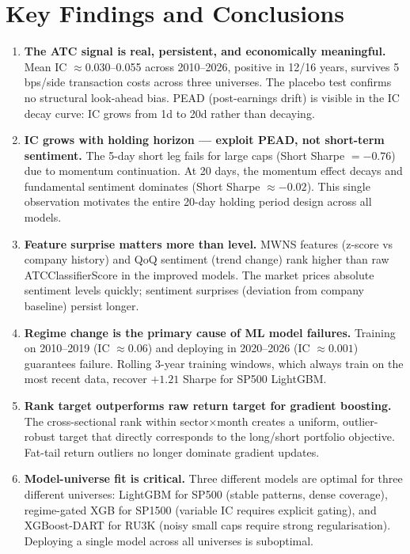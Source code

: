 \documentclass[11pt,a4paper]{article}
\begin{document}
\section{Key Findings and Conclusions}

\begin{enumerate}[leftmargin=*]
  \item \textbf{The ATC signal is real, persistent, and economically meaningful.} Mean IC $\approx 0.030$--0.055 across 2010--2026, positive in 12/16 years, survives 5\,bps/side transaction costs across three universes. The placebo test confirms no structural look-ahead bias. PEAD (post-earnings drift) is visible in the IC decay curve: IC grows from 1d to 20d rather than decaying.

  \item \textbf{IC grows with holding horizon --- exploit PEAD, not short-term sentiment.} The 5-day short leg fails for large caps (Short Sharpe $= -0.76$) due to momentum continuation. At 20 days, the momentum effect decays and fundamental sentiment dominates (Short Sharpe $\approx -0.02$). This single observation motivates the entire 20-day holding period design across all models.

  \item \textbf{Feature surprise matters more than level.} MWNS features (z-score vs company history) and QoQ sentiment (trend change) rank higher than raw ATCClassifierScore in the improved models. The market prices absolute sentiment levels quickly; sentiment surprises (deviation from company baseline) persist longer.

  \item \textbf{Regime change is the primary cause of ML model failures.} Training on 2010--2019 (IC $\approx 0.06$) and deploying in 2020--2026 (IC $\approx 0.001$) guarantees failure. Rolling 3-year training windows, which always train on the most recent data, recover $+1.21$ Sharpe for SP500 LightGBM.

  \item \textbf{Rank target outperforms raw return target for gradient boosting.} The cross-sectional rank within sector$\times$month creates a uniform, outlier-robust target that directly corresponds to the long/short portfolio objective. Fat-tail return outliers no longer dominate gradient updates.

  \item \textbf{Model-universe fit is critical.} Three different models are optimal for three different universes: LightGBM for SP500 (stable patterns, dense coverage), regime-gated XGB for SP1500 (variable IC requires explicit gating), and XGBoost-DART for RU3K (noisy small caps require strong regularisation). Deploying a single model across all universes is suboptimal.


\end{enumerate}
\end{document}
